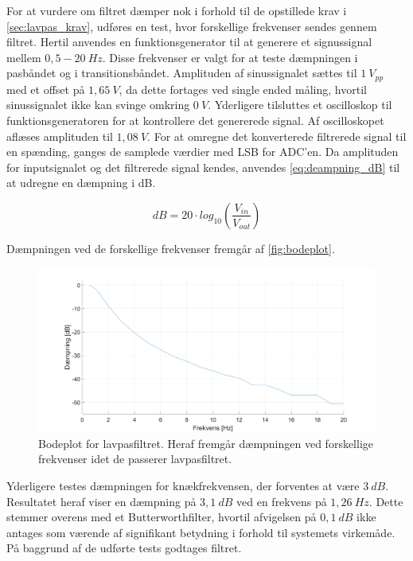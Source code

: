 For at vurdere om filtret dæmper nok i forhold til de opstillede krav i \autoref{sec:lavpas_krav}, udføres en test, hvor forskellige frekvenser sendes gennem filtret. 
Hertil anvendes en funktionsgenerator til at generere et signussignal mellem $0,5-20~Hz$. 
Disse frekvenser er valgt for at teste dæmpningen i pasbåndet og i transitionsbåndet.  
Amplituden af sinussignalet sættes til $1~V_{pp}$ med et offset på $1,65~V$, da dette fortages ved single ended måling, hvortil sinussignalet ikke kan svinge omkring $0~V$. 
Yderligere tilsluttes et oscilloskop til funktionsgeneratoren for at kontrollere det genererede signal. Af oscilloskopet aflæses amplituden til $1,08~V$.  
For at omregne det konverterede filtrerede signal til en spænding, ganges de samplede værdier med LSB for ADC'en. 
Da amplituden for inputsignalet og det filtrerede signal kendes, anvendes \autoref{eq:deampning_dB} til at udregne en dæmpning i dB.

\begin{equation} \label{eq:deampning_dB}
	dB = 20 \cdot log_{10}(\frac{V_{in}}{V_{out}})
\end{equation}

\noindent
Dæmpningen ved de forskellige frekvenser fremgår af \autoref{fig:bodeplot}.

\begin{figure}[H]
\centering
\includegraphics[width=1\textwidth]{figures/bodeplot_lavpas2}
\caption{Bodeplot for lavpasfiltret. Heraf fremgår dæmpningen ved forskellige frekvenser idet de passerer lavpasfiltret.}
\label{fig:bodeplot}
\end{figure}

\noindent
Yderligere testes dæmpningen for knækfrekvensen, der forventes at være $3~dB$. 
Resultatet heraf viser en dæmpning på $3,1~dB$ ved en frekvens på $1,26~Hz$. 
Dette stemmer overens med et Butterworthfilter, hvortil afvigelsen på $0,1~dB$ ikke antages som værende af signifikant betydning i forhold til systemets virkemåde. 
På baggrund af de udførte tests godtages filtret. 

